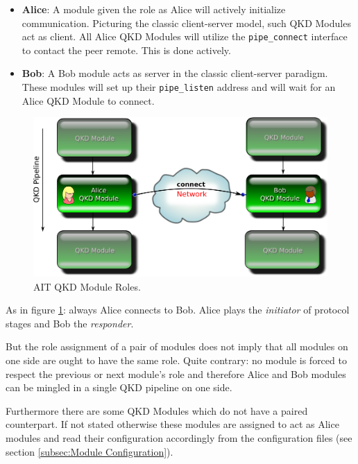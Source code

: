 \begin{itemize}

\item{\textbf{Alice}}: A module given the role as Alice will actively initialize communication. Picturing the classic client-server model, such QKD Modules act as client. All Alice QKD Modules will utilize the \texttt{pipe\_connect} interface to contact the peer remote. This is done actively.

\item{\textbf{Bob}}: A Bob module acts as server in the classic client-server paradigm. These modules will set up their \texttt{pipe\_listen} address and will wait for an Alice QKD Module to connect.

\end{itemize}

\begin{figure}[h]
    \centering
    \includegraphics[scale=0.50,keepaspectratio=true]{./gfx/qkd-module-roles.png}
    \caption{AIT QKD Module Roles.}
    \label{fig:qkd-module-roles}
\end{figure}

\medskip

As in figure \ref{fig:qkd-module-roles}: always Alice connects to Bob. Alice plays the \emph{initiator} of protocol stages and Bob the \emph{responder}.

\medskip

But the role assignment of a pair of modules does not imply that all modules on one side are ought to have the same role. Quite contrary: no module is forced to respect the previous or next module's role and therefore Alice and Bob modules can be mingled in a single QKD pipeline on one side.

\medskip

Furthermore there are some QKD Modules which do not have a paired counterpart. If not stated otherwise these modules are assigned to act as Alice modules and read their configuration accordingly from the configuration files (see section \ref{subsec:Module Configuration}).

